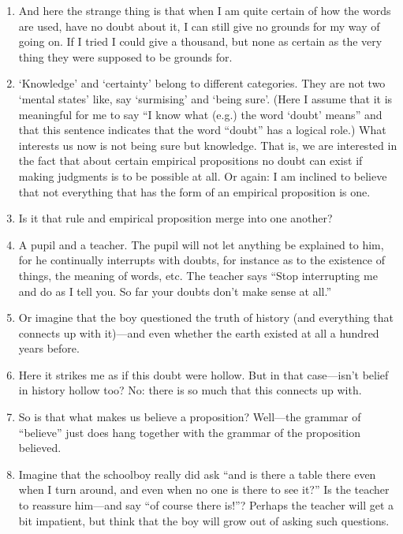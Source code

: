 \documentclass{book}
\begin{document}
\begin{enumerate}
\item
And here the strange thing is that when I am quite certain of how the words are
used, have no doubt about it, I can still give no grounds for my way of going
on. If I tried I could give a thousand, but none as certain as the very thing
they were supposed to be grounds for.

\item
`Knowledge' and `certainty' belong to different categories. They are not two
`mental states' like, say `surmising' and `being sure'. (Here I assume that it
is meaningful for me to say ``I know what (e.g.) the word `doubt' means'' and
that this sentence indicates that the word ``doubt'' has a logical role.) What
interests us now is not being sure but knowledge. That is, we are interested in
the fact that about certain empirical propositions no doubt can exist if making
judgments is to be possible at all. Or again: I am inclined to believe that not
everything that has the form of an empirical proposition is one.

\item
Is it that rule and empirical proposition merge into one another?

\item
A pupil and a teacher. The pupil will not let anything be explained to him, for
he continually interrupts with doubts, for instance as to the existence of
things, the meaning of words, etc. The teacher says ``Stop interrupting me and
do as I tell you. So far your doubts don't make sense at all.''

\item
Or imagine that the boy questioned the truth of history (and everything that
connects up with it)---and even whether the earth existed at all a hundred
years before.

\item
Here it strikes me as if this doubt were hollow. But in that case---isn't
belief in history hollow too? No: there is so much that this connects up with.

\item
So is that what makes us believe a proposition? Well---the grammar of
``believe'' just does hang together with the grammar of the proposition
believed.

\item
Imagine that the schoolboy really did ask ``and is there a table there even
when I turn around, and even when no one is there to see it?'' Is the teacher
to reassure him---and say ``of course there is!''?  Perhaps the teacher will
get a bit impatient, but think that the boy will grow out of asking such
questions.


\end{enumerate}
\end{document}
